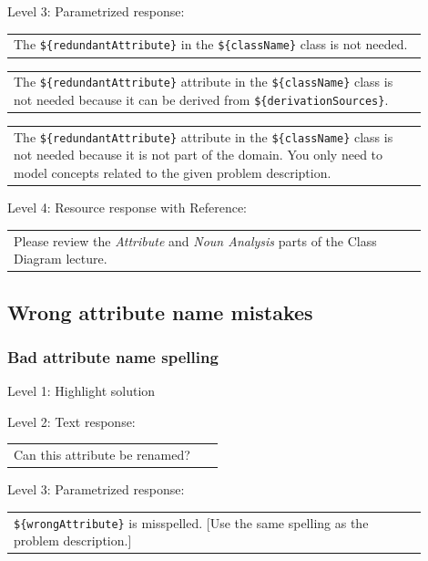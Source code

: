 \noindent Level 3: Parametrized response: \medskip

\begin{tabular}{|p{0.9\linewidth}}
The \verb|${redundantAttribute}| in the \verb|${className}| class is not needed.
\end{tabular} \medskip

\begin{tabular}{|p{0.9\linewidth}}
The \verb|${redundantAttribute}| attribute in the \verb|${className}| class is not needed because it can be derived from \verb|${derivationSources}|.
\end{tabular} \medskip

\begin{tabular}{|p{0.9\linewidth}}
The \verb|${redundantAttribute}| attribute in the \verb|${className}| class is not needed because it is not part of the domain. You only need to model concepts related to the given problem description.
\end{tabular} \medskip

\noindent Level 4: Resource response with Reference: \medskip

\begin{tabular}{|p{0.9\linewidth}}
Please review the \textit{Attribute} and \textit{Noun Analysis} parts of the Class Diagram lecture.
\end{tabular} \medskip


\subsection{Wrong attribute name mistakes}

\subsubsection{Bad attribute name spelling}

\noindent Level 1: Highlight solution \medskip

\noindent Level 2: Text response: \medskip

\begin{tabular}{|p{0.9\linewidth}}
Can this attribute be renamed?
\end{tabular} \medskip

\noindent Level 3: Parametrized response: \medskip

\begin{tabular}{|p{0.9\linewidth}}
\verb|${wrongAttribute}| is misspelled. [Use the same spelling as the problem description.]
\end{tabular} \medskip

